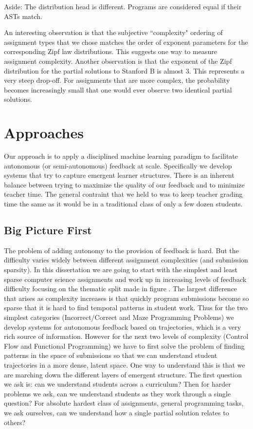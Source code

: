 Aside: The distribution head is different. Programs are considered equal if their ASTs match.

 An interesting observation is that the subjective ``complexity" ordering of assignment types that we chose matches the order of exponent parameters for the corresponding Zipf law distributions. This suggests one way to measure assignment complexity. Another observation is that the exponent of the Zipf distribution for the partial solutions to Stanford B is almost 3. This represents a very steep drop-off. For assignments that are more complex, the probability becomes increasingly small that one would ever observe two identical partial solutions.

\section{Approaches}

Our approach is to apply a disciplined machine learning paradigm to facilitate autonomous (or semi-autonomous) feedback at scale. Specifically we develop systems that try to capture emergent learner structures. There is an inherent balance between trying to maximize the quality of our feedback and to minimize teacher time. The general contraint that we held to was to keep teacher grading time the same as it would be in a traditional class of only a few dozen students.

\subsection{Big Picture First}

The problem of adding autonomy to the provision of feedback is hard. But the difficulty varies widely between different assignment complexities (and submission sparsity). In this dissertation we are going to start with the simplest and least sparse computer science assignments and work up in increasing levels of feedback difficulty focusing on the thematic split made in figure \cite{fig:assnTypes}. The largest difference that arises as complexity increases is that quickly program submissions become so sparse that it is hard to find temporal patterns in student work. Thus for the two simplest categories (Incorrect/Correct and Maze Programming Problems) we develop systems for autonomous feedback based on trajectories, which is a very rich source of information. However for the next two levels of complexity (Control Flow and Functional Programming) we have to first solve the problem of finding patterns in the space of submissions so that we can understand student trajectories in a more dense, latent space. One way to understand this is that we are marching down the different layers of emergent structure. The first question we ask is: can we understand students across a curriculum? Then for harder problems we ask, can we understand students as they work through a single question? For absolute hardest class of assignments, general programming tasks, we ask ourselves, can we understand how a single partial solution relates to others?

